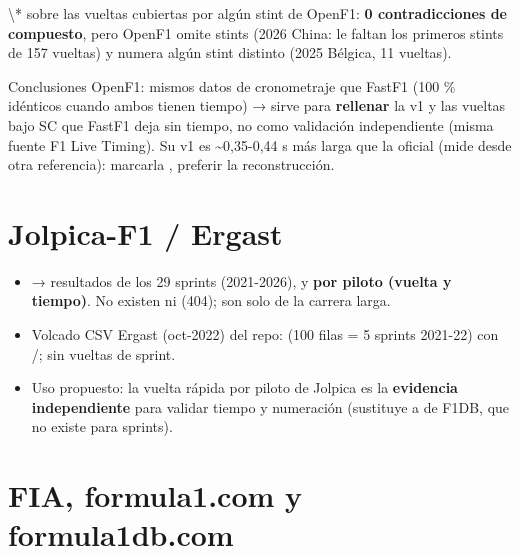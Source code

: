 \textbackslash{}* sobre las vueltas cubiertas por algún stint de OpenF1: \textbf{0 contradicciones de compuesto}, pero OpenF1 omite stints (2026 China: le faltan los primeros stints de 157 vueltas) y numera algún stint distinto (2025 Bélgica, 11 vueltas).

Conclusiones OpenF1: mismos datos de cronometraje que FastF1 (100 \% idénticos cuando ambos tienen tiempo) → sirve para \textbf{rellenar} la v1 y las vueltas bajo SC que FastF1 deja sin tiempo, no como validación independiente (misma fuente F1 Live Timing). Su v1 es \textasciitilde{}0,35-0,44 s más larga que la oficial (mide desde otra referencia): marcarla , preferir la reconstrucción.

\section{Jolpica-F1 / Ergast}

\begin{itemize}
\item {} → resultados de los 29 sprints (2021-2026), y \textbf{por piloto  (vuelta y tiempo)}. No existen  ni  (404);  son solo de la carrera larga.
\item Volcado CSV Ergast (oct-2022) del repo:  (100 filas = 5 sprints 2021-22) con /; sin vueltas de sprint.
\item Uso propuesto: la vuelta rápida por piloto de Jolpica es la \textbf{evidencia independiente} para validar tiempo y numeración (sustituye a  de F1DB, que no existe para sprints).
\end{itemize}

\section{FIA, formula1.com y formula1db.com}

